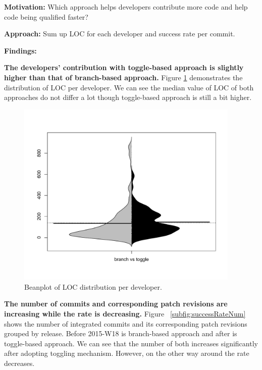 \textbf{Motivation:}
Which approach helps developers contribute more code and help code being qualified faster?

\textbf{Approach:}
Sum up LOC for each developer and success rate per commit.

\textbf{Findings:} 

\textbf{The developers' contribution with toggle-based approach is slightly higher than that of branch-based approach.} Figure \ref{fig:LOC} demonstrates the distribution of LOC per developer. We can see the median value of LOC of both approaches do not differ a lot though toggle-based approach is still a bit higher.


\begin{figure}
\includegraphics[width=0.95\textwidth]{figure/avgLOC.pdf}
\caption{Beanplot of LOC distribution per developer.}
\label{fig:LOC}
\end{figure}


\textbf{The number of commits and corresponding patch revisions are increasing while the rate is decreasing.} Figure ~\ref{subfig:successRateNum} shows the number of integrated commits and its corresponding patch revisions grouped by release. Before 2015-W18 is branch-based approach and after is toggle-based approach. We can see that the number of both increases significantly after adopting toggling mechanism. However, on the other way around the rate decreases. 

